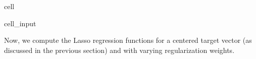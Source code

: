 \documentclass[letterpaper,10pt,english]{jupyterBook}
\begin{document}
\begin{sphinxuseclass}{cell}\begin{sphinxVerbatimInput}

\begin{sphinxuseclass}{cell_input}
\begin{sphinxVerbatim}[commandchars=\\\{\}]
  
    \PYG{p}{[}\PYG{p}{]}
      
       
           
              \PYG{p}{[}\PYG{p}{]} \PYG{p}{[}\PYG{p}{]}\PYG{p}{[}\PYG{p}{]}
            \PYG{p}{[}\PYG{p}{]}  
            \PYG{p}{[}\PYG{p}{]}  \PYG{p}{[}\PYG{p}{]}\PYG{p}{[}\PYG{p}{]}
     
\end{sphinxVerbatim}

\end{sphinxuseclass}\end{sphinxVerbatimInput}

\end{sphinxuseclass}
\sphinxAtStartPar
Now, we compute the Lasso regression functions for a centered target vector (as discussed in the previous section) and with varying regularization weights.
\end{document}
